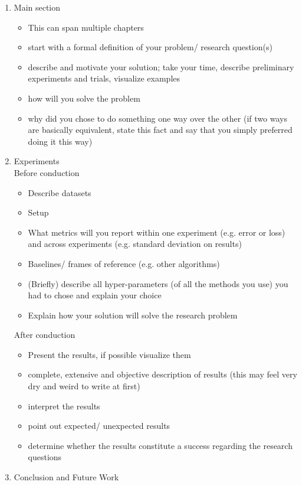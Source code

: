 \documentclass[nodate]{proc}
\begin{document}
\begin{enumerate}
\begin{itemize}
		\end{itemize}
	\item Main section
		\begin{itemize}
			\item This can span multiple chapters
			\item start with a formal definition of your problem/ research question(s)
			\item describe and motivate your solution; take your time, describe preliminary experiments and trials, visualize examples
			\item how will you solve the problem
			\item why did you chose to do something one way over the other (if two ways are basically equivalent, state this fact and say that you simply preferred doing it this way)
		\end{itemize}
	\item Experiments\\
		Before conduction
		\begin{itemize}
			\item Describe datasets
			\item Setup
			\item What metrics will you report within one experiment (e.g. error or loss) and across experiments (e.g. standard deviation on results)
			\item Baselines/ frames of reference (e.g. other algorithms)
			\item (Briefly) describe all hyper-parameters (of all the methods you use) you had to chose and explain your choice
			\item Explain how your solution will solve the research problem
		\end{itemize} 
		After conduction
		\begin{itemize}
			\item Present the results, if possible visualize them
			\item complete, extensive and objective description of results (this may feel very dry and weird to write at first)
			\item interpret the results
			\item point out expected/ unexpected results
			\item determine whether the results constitute a success regarding the research questions
		\end{itemize}
	\item Conclusion and Future Work
		\begin{itemize}

\end{itemize}
\end{enumerate}
\end{document}
